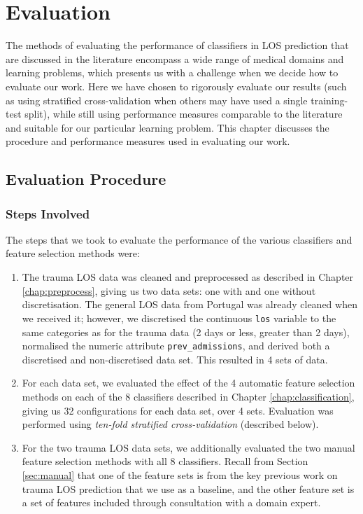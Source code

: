 \chapter{Evaluation} \label{chap:evaluation}

The methods of evaluating the performance of classifiers in LOS prediction
that are discussed in the literature encompass a wide range of medical
domains and learning problems, which presents us with a challenge when we
decide how to evaluate our work. Here we have chosen to rigorously evaluate
our results (such as using stratified cross-validation when others may have
used a single training-test split), while still using performance measures
comparable to the literature and suitable for our particular learning problem.
This chapter discusses the procedure and performance measures used
in evaluating our work.

\section{Evaluation Procedure}
\subsection{Steps Involved}
The steps that we took to evaluate the performance of the various classifiers
and feature selection methods were:
\begin{enumerate}
\item The trauma LOS data was cleaned and preprocessed as described in Chapter
\ref{chap:preprocess}, giving us two data sets: one with and one without
discretisation. The general LOS data from Portugal was already cleaned when we
received it; however, we discretised the continuous \texttt{los} variable to
the same categories as for the trauma data (2 days or less, greater than 2
days), normalised the numeric attribute \texttt{prev\_admissions}, and derived
both a discretised and non-discretised data set. This resulted in 4 sets of
data.
\item For each data set, we evaluated the effect of the 4 automatic feature
selection methods on each of the 8 classifiers described in Chapter
\ref{chap:classification}, giving us 32 configurations for each data set, over
4 sets. Evaluation was performed using \textit{ten-fold stratified
cross-validation} (described below).
\item For the two trauma LOS data sets, we additionally evaluated the two
manual feature selection methods with all 8 classifiers. Recall from Section
\ref{sec:manual} that one of the feature sets is from the key previous work
on trauma LOS prediction that we use as a baseline, and the other feature set
is a set of features included through consultation with a domain expert.
\end{enumerate}

